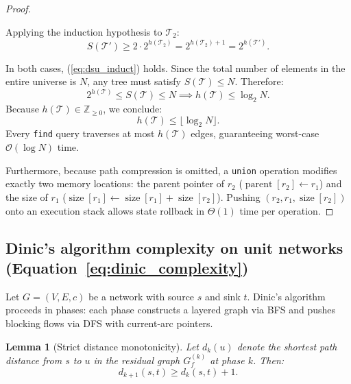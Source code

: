 \documentclass[11pt, letterpaper]{article}
\newtheorem{lemma}{Lemma}[section]
\begin{document}
\begin{proof}
\begin{itemize}
\begin{equation}
    \end{equation}
    Applying the induction hypothesis to $\mathcal{T}_2$:
    \begin{equation}
        S(\mathcal{T}') \ge 2 \cdot 2^{h(\mathcal{T}_2)} = 2^{h(\mathcal{T}_2) + 1} = 2^{h(\mathcal{T}')}.
    \end{equation}
\end{itemize}
In both cases, (\ref{eq:dsu_induct}) holds. 
Since the total number of elements in the entire universe is $N$, any tree must satisfy $S(\mathcal{T}) \le N$. Therefore:
\begin{equation}
    2^{h(\mathcal{T})} \le S(\mathcal{T}) \le N \implies h(\mathcal{T}) \le \log_2 N.
\end{equation}
Because $h(\mathcal{T}) \in \mathbb{Z}_{\ge 0}$, we conclude:
\begin{equation}
    h(\mathcal{T}) \le \lfloor \log_2 N \rfloor.
\end{equation}
Every \texttt{find} query traverses at most $h(\mathcal{T})$ edges, guaranteeing worst-case $\mathcal{O}(\log N)$ time. 

Furthermore, because path compression is omitted, a \texttt{union} operation modifies exactly two memory locations: the parent pointer of $r_2$ ($\operatorname{parent}[r_2] \leftarrow r_1$) and the size of $r_1$ ($\operatorname{size}[r_1] \leftarrow \operatorname{size}[r_1] + \operatorname{size}[r_2]$). Pushing $(r_2, r_1, \operatorname{size}[r_2])$ onto an execution stack allows state rollback in $\Theta(1)$ time per operation.
\end{proof}

\subsection{Dinic's algorithm complexity on unit networks (\texorpdfstring{Equation~\ref{eq:dinic_complexity}}{Eq. 8})}
Let $G = (V, E, c)$ be a network with source $s$ and sink $t$. Dinic's algorithm proceeds in phases: each phase constructs a layered graph via BFS and pushes blocking flows via DFS with current-arc pointers.

\begin{lemma}[Strict distance monotonicity]
Let $d_k(u)$ denote the shortest path distance from $s$ to $u$ in the residual graph $G_f^{(k)}$ at phase $k$. Then:
\begin{equation}
    d_{k+1}(s, t) \ge d_k(s, t) + 1.
\end{equation}
\end{lemma}
\end{document}
